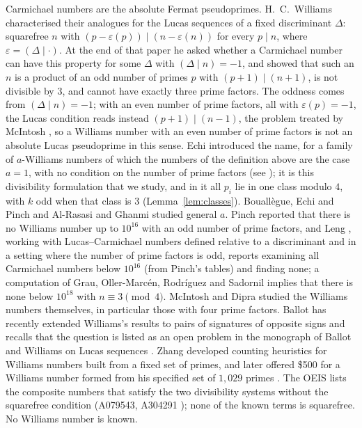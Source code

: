 \documentclass[11pt]{amsart}
\theoremstyle{definition}
\theoremstyle{remark}
\begin{document}
Carmichael numbers are the absolute Fermat pseudoprimes. H.~C.~Williams \cite{Williams77} characterised their analogues for the Lucas sequences of a fixed discriminant $\Delta$: squarefree $n$ with $(p-\varepsilon(p))\mid(n-\varepsilon(n))$ for every $p\mid n$, where $\varepsilon=(\Delta\mid\cdot)$. At the end of that paper he asked whether a Carmichael number can have this property for some $\Delta$ with $(\Delta\mid n)=-1$, and showed that such an $n$ is a product of an odd number of primes $p$ with $(p+1)\mid(n+1)$, is not divisible by $3$, and cannot have exactly three prime factors. The oddness comes from $(\Delta\mid n)=-1$; with an even number of prime factors, all with $\varepsilon(p)=-1$, the Lucas condition reads instead $(p+1)\mid(n-1)$, the problem treated by McIntosh \cite{McIntosh14}, so a Williams number with an even number of prime factors is not an absolute Lucas pseudoprime in this sense. Echi \cite{Echi07} introduced the name, for a family of $a$-Williams numbers of which the numbers of the definition above are the case $a=1$, with no condition on the number of prime factors (see \cite[p.~310]{Zhang15}); it is this divisibility formulation that we study, and in it all $p_i$ lie in one class modulo $4$, with $k$ odd when that class is $3$ (Lemma~\ref{lem:classes}). Bouall\`egue, Echi and Pinch \cite{BEP10} and Al-Rasasi and Ghanmi \cite{AG13} studied general $a$. Pinch \cite{Pinch07} reported that there is no Williams number up to $10^{16}$ with an odd number of prime factors, and Leng \cite{Leng17}, working with Lucas--Carmichael numbers defined relative to a discriminant and in a setting where the number of prime factors is odd, reports examining all Carmichael numbers below $10^{16}$ (from Pinch's tables) and finding none; a computation of Grau, Oller-Marc\'en, Rodr\'iguez and Sadornil \cite[Prop.~6.1 and the sentence preceding it; Prop.~15 in the arXiv version]{Grau15} implies that there is none below $10^{18}$ with $n\equiv3\pmod4$. McIntosh and Dipra \cite{MD15} studied the Williams numbers themselves, in particular those with four prime factors. Ballot \cite{Ballot26} has recently extended Williams's results to pairs of signatures of opposite signs and recalls that the question is listed as an open problem in the monograph of Ballot and Williams on Lucas sequences \cite[\S4]{Ballot26}. Zhang \cite{Zhang15} developed counting heuristics for Williams numbers built from a fixed set of primes, and later offered \$500 for a Williams number formed from his specified set of $1{,}029$ primes \cite{ZhangPrize}. The OEIS lists the composite numbers that satisfy the two divisibility systems without the squarefree condition (A079543, A304291 \cite{OEIS}); none of the known terms is squarefree. No Williams number is known.
\end{document}
